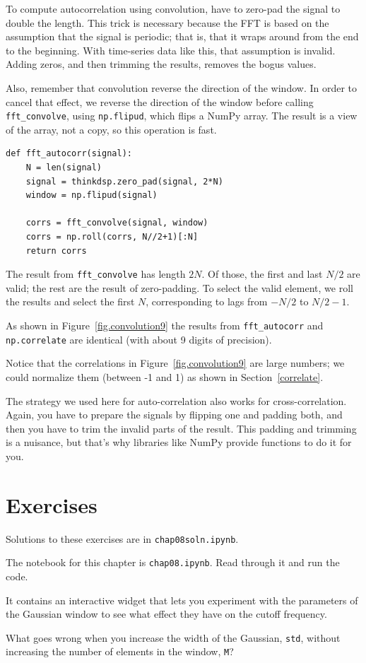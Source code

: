 \documentclass[12pt]{book}
\begin{document}
To compute autocorrelation using convolution,
have to zero-pad the signal to double the length.
This trick is necessary because the FFT is based
on the assumption that the signal is periodic; that is, that it wraps
around from the end to the beginning.  With time-series data like
this, that assumption is invalid.  Adding zeros, and then trimming
the results, removes the bogus values.

Also, remember that convolution reverse the direction of the window.
In order to cancel that effect, we reverse the direction of the
window before calling \verb"fft_convolve", using {\tt np.flipud},
which flips a NumPy array.  The result is a view of the array,
not a copy, so this operation is fast.

\begin{verbatim}
def fft_autocorr(signal):
    N = len(signal)
    signal = thinkdsp.zero_pad(signal, 2*N)
    window = np.flipud(signal)

    corrs = fft_convolve(signal, window)
    corrs = np.roll(corrs, N//2+1)[:N]
    return corrs
\end{verbatim}

The result from \verb"fft_convolve" has length $2N$.  Of those,
the first and last $N/2$ are valid; the rest are the result of
zero-padding.  To select the valid element, we roll the results
and select the first $N$, corresponding to lags from $-N/2$ to
$N/2-1$.

As shown in Figure~\ref{fig.convolution9} the results from
\verb"fft_autocorr" and {\tt np.correlate} are identical (with
about 9 digits of precision).

Notice that the correlations in Figure~\ref{fig.convolution9} are
large numbers; we could normalize them (between -1 and 1) as shown
in Section~\ref{correlate}.

The strategy we used here for auto-correlation also works for
cross-correlation.  Again, you have to prepare the signals by flipping
one and padding both, and then you have to trim the invalid parts of
the result.  This padding and trimming is a nuisance, but that's why
libraries like NumPy provide functions to do it for you.


\section{Exercises}

Solutions to these exercises are in {\tt chap08soln.ipynb}.

\begin{exercise}
The notebook for this chapter is {\tt chap08.ipynb}.
Read through it and run the code.

It contains an interactive widget that lets you
experiment with the parameters of the Gaussian window to see
what effect they have on the cutoff frequency.

What goes wrong when you increase the width of the Gaussian,
{\tt std}, without increasing the number of elements in the window,
{\tt M}?
\end{exercise}
\end{document}
